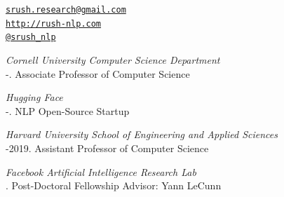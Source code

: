 \documentclass[10pt]{article}
\makeatletter
\def\myemail{srush.research@gmail.com}
\def\myweb{http://rush-nlp.com}
\def\myphone{(215) 317-8089}
\def\myfax{srush\_nlp}
\makeatother
\begin{document}
\begin{minipage}[t]{2.95in}

\end{minipage}
\hfill
\hfill
\begin{minipage}[t]{1.7in}
	\flushright %
	{\scriptsize  \texttt{\href{mailto:\myemail}{\myemail}}} \\
	{\scriptsize  \texttt{\href{\myweb}{\myweb}}} \\
	{\scriptsize  \texttt{\href{http://twitter.com/\myfax}{@\myfax}}} \\
\end{minipage}


\medskip

\reversemarginpar
\medskip


\noindent\emph{Cornell University Computer Science Department \vspace{0.01in}}\\
-.  Associate Professor of Computer Science

\medskip
\noindent\emph{Hugging Face \vspace{0.01in}}\\
-.  NLP Open-Source Startup

\medskip
\noindent\emph{Harvard University School of Engineering and Applied Sciences \vspace{0.01in}}\\
-2019.  Assistant Professor of Computer Science

\medskip
\noindent\emph{Facebook Artificial Intelligence Research Lab \vspace{0.01in}}\\
.  Post-Doctoral Fellowship Advisor: Yann LeCunn

\bigskip

\end{document}
